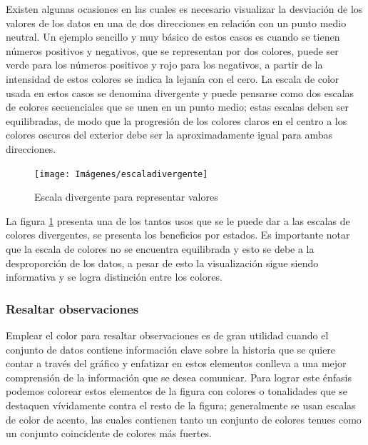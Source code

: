 \documentclass[
]{book}
\begin{document}
Existen algunas ocasiones en las cuales es necesario visualizar la desviación de los valores de los datos en una de dos direcciones en relación con un punto medio neutral. Un ejemplo sencillo y muy básico de estos casos es cuando se tienen números positivos y negativos, que se representan por dos colores, puede ser verde para los números positivos y rojo para los negativos, a partir de la intensidad de estos colores se indica la lejanía con el cero. La escala de color usada en estos casos se denomina divergente y puede pensarse como dos escalas de colores secuenciales que se unen en un punto medio; estas escalas deben ser equilibradas, de modo que la progresión de los colores claros en el centro a los colores oscuros del exterior debe ser la aproximadamente igual para ambas direcciones.

\begin{figure}

{\centering \texttt{[image: Imágenes/escaladivergente]} 

}

\caption{Escala divergente para representar valores}\label{fig:escaladivergente-fig}
\end{figure}

La figura \ref{fig:escaladivergente-fig} presenta una de los tantos usos que se le puede dar a las escalas de colores divergentes, se presenta los beneficios por estados. Es importante notar que la escala de colores no se encuentra equilibrada y esto se debe a la desproporción de los datos, a pesar de esto la visualización sigue siendo informativa y se logra distinción entre los colores.

\hypertarget{resaltar-observaciones}{%
\subsubsection{Resaltar observaciones}\label{resaltar-observaciones}}

Emplear el color para resaltar observaciones es de gran utilidad cuando el conjunto de datos contiene información clave sobre la historia que se quiere contar a través del gráfico y enfatizar en estos elementos conlleva a una mejor comprensión de la información que se desea comunicar. Para lograr este énfasis podemos colorear estos elementos de la figura con colores o tonalidades que se destaquen vívidamente contra el resto de la figura; generalmente se usan escalas de color de acento, las cuales contienen tanto un conjunto de colores tenues como un conjunto coincidente de colores más fuertes.
\end{document}
